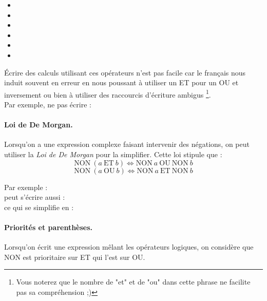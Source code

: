 			\begin{small}
			\begin{multicols}{2}
				\begin{itemize}
					\item {}
					\item {}
					\item {}
					\item {}
					\item {}
					\item {}
				\end{itemize}
			\end{multicols}
			\end{small}
	
			Écrire des calculs utilisant ces opérateurs n'est pas facile
			car le français nous induit souvent en erreur
			en nous poussant à utiliser un ET pour un OU et inversement
			ou bien à utiliser des raccourcis d'écriture ambigus%
			\footnote{%
				Vous noterez que le nombre de "et" et de "ou"
				dans cette phrase ne facilite pas sa compréhension ;)%
			}. 
			\\Par exemple, ne pas écrire : 
	
			\paragraph{Loi de De Morgan.}
			Lorsqu'on a une expression complexe faisant intervenir
			des négations, on peut utiliser la \emph{Loi de De Morgan}
			pour la simplifier.
			Cette loi stipule que :
			\[
				\mathrm{NON}\ (a\ \mathrm{ET}\ b) \Leftrightarrow \mathrm{NON}\ a\ \mathrm{OU}\ \mathrm{NON}\ b
			\]
			\[
				\mathrm{NON}\ (a\ \mathrm{OU}\ b) \Leftrightarrow \mathrm{NON}\ a\ \mathrm{ET}\ \mathrm{NON}\ b
			\]
			
			Par exemple : 
			\\peut s'écrire aussi : 
			\\ce qui se simplifie en : 

			\paragraph{Priorités et parenthèses.}
			Lorsqu'on écrit une expression mêlant les opérateurs logiques,
			on considère que NON est prioritaire sur ET qui l'est sur OU.
			
